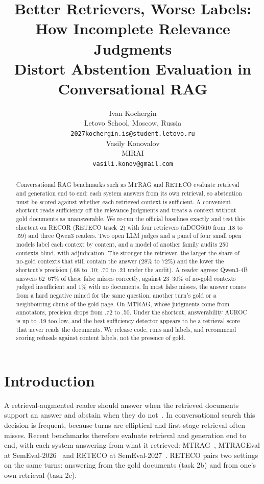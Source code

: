 \documentclass[11pt]{article}
\title{Better Retrievers, Worse Labels: How Incomplete Relevance Judgments\\
Distort Abstention Evaluation in Conversational RAG}
\author{Ivan Kochergin \\
  Letovo School, Moscow, Russia \\
  \texttt{2027kochergin.is@student.letovo.ru} \\\And
  Vasily Konovalov \\
  MIRAI \\
  \texttt{vasili.konov@gmail.com}}
\begin{document}
\maketitle

\begin{abstract}
Conversational RAG benchmarks such as MTRAG and RETECO evaluate retrieval and generation end to end: each system answers from its own retrieval, so abstention must be scored against whether each retrieved context is sufficient. A convenient shortcut reads sufficiency off the relevance judgments and treats a context without gold documents as unanswerable. We re-run the official baselines exactly and test this shortcut on RECOR (RETECO track~2) with four retrievers (nDCG@10 from .18 to .59) and three Qwen3 readers. Two open LLM judges and a panel of four small open models label each context by content, and a model of another family audits 250 contexts blind, with adjudication. The stronger the retriever, the larger the share of no-gold contexts that still contain the answer (28\% to 72\%) and the lower the shortcut's precision (.68 to .10; .70 to .21 under the audit). A reader agrees: Qwen3-4B answers 62--67\% of these false misses correctly, against 23--30\% of no-gold contexts judged insufficient and 1\% with no documents. In most false misses, the answer comes from a hard negative mined for the same question, another turn's gold or a neighbouring chunk of the gold page. On MTRAG, whose judgments come from annotators, precision drops from .72 to .50. Under the shortcut, answerability AUROC is up to .19 too low, and the best sufficiency detector appears to be a retrieval score that never reads the documents. We release code, runs and labels, and recommend scoring refusals against content labels, not the presence of gold.
\end{abstract}

\section{Introduction}

A retrieval-augmented reader should answer when the retrieved documents support an answer and abstain when they do not~\cite{joren2025sufficient,song2025trustscore}. In conversational search this decision is frequent, because turns are elliptical and first-stage retrieval often misses. Recent benchmarks therefore evaluate retrieval and generation end to end, with each system answering from what it retrieved: MTRAG~\cite{katsis2025mtrag}, MTRAGEval at SemEval-2026~\cite{rosenthal2026semeval} and RETECO at SemEval-2027~\cite{abdallah2026reteco}. RETECO pairs two settings on the same turns: answering from the gold documents (task 2b) and from one's own retrieval (task 2c).
\end{document}
